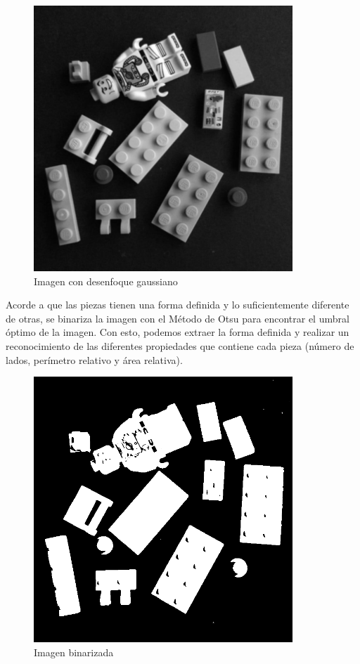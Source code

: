 \documentclass[letterpaper]{scrreprt}
\begin{document}
\begin{figure}[H]
	\centering
	\includegraphics[width=0.8\linewidth, height=10cm]{Process/fifthStage5_blured.png}
	\caption{Imagen con desenfoque gaussiano}
\end{figure}

Acorde a que las piezas tienen una forma definida y lo suficientemente diferente de otras, se binariza la imagen con el Método de Otsu para encontrar el umbral óptimo de la imagen. Con esto, podemos extraer la forma definida y realizar un reconocimiento de las diferentes propiedades que contiene cada pieza (número de lados, perímetro relativo y área relativa).

\begin{figure}[H]
	\centering
	\includegraphics[width=0.8\linewidth, height=10cm]{Process/fifthStage5_threshold.png}
	\caption{Imagen binarizada}
\end{figure}
\end{document}
